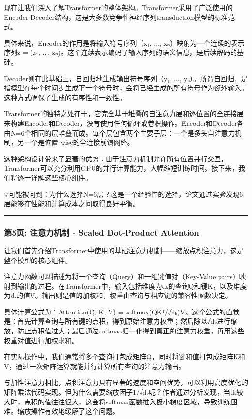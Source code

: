 \documentclass[11pt,a4paper]{article}
\begin{document}
现在让我们深入了解Transformer的整体架构。Transformer采用了广泛使用的Encoder-Decoder结构，这是大多数竞争性神经序列transduction模型的标准范式。

具体来说，Encoder的作用是将输入符号序列（x₁, ..., xₙ）映射为一个连续的表示序列z = (z₁, ..., zₙ)。这个连续表示编码了输入序列的语义信息，是后续解码的基础。

Decoder则在此基础上，自回归地生成输出符号序列（y₁, ..., yₙ）。所谓自回归，是指模型在每个时间步生成下一个符号时，会将已经生成的所有符号作为额外输入。这种方式确保了生成的有序性和一致性。

Transformer的独特之处在于，它完全基于堆叠的自注意力层和逐位置的全连接层来构建Encoder和Decoder，没有使用任何循环或卷积操作。Encoder和Decoder各由N=6个相同的层堆叠而成。每个层包含两个主要子层：一个是多头自注意力机制，另一个是位置-wise的全连接前馈网络。

这种架构设计带来了显著的优势：由于注意力机制允许所有位置并行交互，Transformer可以充分利用GPU的并行计算能力，大幅缩短训练时间。接下来，我们将逐一详解这些核心组件。

💡可能被问到：为什么选择N=6层？这是一个经验性的选择，论文通过实验发现6层能够在性能和计算成本之间取得良好平衡。

\vspace{0.5em}\noindent\rule{\textwidth}{0.4pt}\vspace{0.5em}

\subsubsection*{第5页: 注意力机制 - Scaled Dot-Product Attention}

让我们首先介绍Transformer中使用的基础注意力机制——缩放点积注意力，这是整个模型的核心组件。

注意力函数可以描述为将一个查询（Query）和一组键值对（Key-Value pairs）映射到输出的过程。在Transformer中，输入包括维度为dₖ的查询Q和键K，以及维度为dᵥ的值V。输出则是值的加权和，权重由查询与相应键的兼容性函数决定。

具体计算公式为：Attention(Q, K, V) = softmax(QKᵀ/√dₖ)V。这个公式的直觉是：首先计算查询与所有键的点积，得到原始注意力权重；然后除以√dₖ进行缩放，防止点积值过大；最后通过softmax归一化得到真正的注意力权重，再用这些权重对值进行加权求和。

在实际操作中，我们通常将多个查询打包成矩阵Q，同时将键和值打包成矩阵K和V，通过一次矩阵运算就能并行计算所有查询的注意力输出。

与加性注意力相比，点积注意力具有显著的速度和空间优势，可以利用高度优化的矩阵乘法代码实现。但为什么需要缩放因子1/√dₖ呢？作者通过分析发现，当dₖ较大时，点积的值往往很大，这会将softmax函数推入极小梯度区域，导致训练困难。缩放操作有效地缓解了这个问题。
\end{document}

